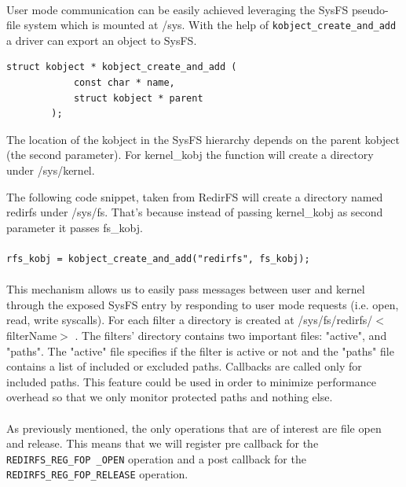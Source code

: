 	\paragraph{}
	User mode communication can be easily achieved leveraging the SysFS pseudo-file system which is mounted at /sys. With the help of \texttt{kobject\_create\_and\_add} a driver can export an object to SysFS. \\
	
	\begin{Verbatim}[fontsize=\small, commandchars=\\\{\}]
struct kobject * kobject_create_and_add (
			const char * name, 
			struct kobject * parent
		);
	\end{Verbatim}
	
	The location of the kobject in the SysFS hierarchy depends on the parent kobject (the second parameter). For kernel\_kobj the function will create a directory under /sys/kernel. 
	
	The following code snippet, taken from RedirFS will create a directory named redirfs under /sys/fs. That's because instead of passing kernel\_kobj as second parameter it passes fs\_kobj. 
	
	\paragraph{}
	\begin{Verbatim}[fontsize=\small, commandchars=\\\{\}]
	rfs_kobj = kobject_create_and_add("redirfs", fs_kobj);
	\end{Verbatim}
	
	\paragraph{}
	This mechanism allows us to easily pass messages between user and kernel through the exposed SysFS entry by responding to user mode requests (i.e. open, read, write syscalls). For each filter a directory is created at /sys/fs/redirfs/$<$ filterName$>$ \cite{RedirFS}. The filters' directory contains two important files: "active", and "paths". The "active" file specifies if the filter is active or not and the "paths" file contains a list of included or excluded paths. Callbacks are called only for included paths. This feature could be used in order to minimize performance overhead so that we only monitor protected paths and nothing else. 
	
	\paragraph{}
	As previously mentioned, the only operations that are of interest are file open and release. This means that we will register pre callback for the \texttt{REDIRFS\_REG\_FOP \_OPEN} operation and a post callback for the \texttt{REDIRFS\_REG\_FOP\_RELEASE} operation. 
	
